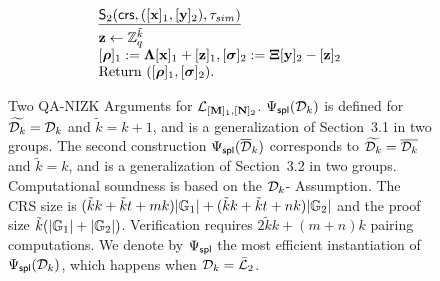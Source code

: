 \begin{figure}
$$\begin{array}{l}
\\
\begin{array}{l}
    \underline{\mathsf{S}_2(\mathsf{crs},([\mathbf{x}]_1,[\mathbf{y}]_2),\tau_{sim})}\\[.1cm]
    \mathbf{z} \gets \mathbb{Z}_q^{\tilde{k}} \\ 
    {[{\boldsymbol \rho}]_1:=\mathbf{{\Lambda}} [\mathbf{x}]_1+ [\mathbf{z}]_1},{[{\boldsymbol \sigma}]_2:=\mathbf{{\Xi}} [\mathbf{y}]_2- [\mathbf{z}]_2}\\
    {\text{Return }  ([{\boldsymbol \rho}]_1,[{\boldsymbol \sigma}]_2).}
\end{array}
\\
\end{array}
$$
\caption{Two QA-NIZK Arguments for  $\mathcal{L}_{[\mathbf{{M}}]_1,[\mathbf{{N}}]_2}$. ${\Psi_{\mathsf{spl}}(\mathcal{D}_k)}$ is 
 defined for $\widetilde{\mathcal{D}_{k}}=\mathcal{D}_k$ and $\tilde{k}=k+1$, and is a generalization of  
 \cite{EC:KilWee15} Section~3.1 in two groups. The second construction ${\Psi_\mathsf{spl}(\overline{\mathcal{D}}_k)}$ corresponds to $\widetilde{\mathcal{D}_{k}}=\overline{\mathcal{D}_k}$ and $\tilde{k}=k$, and is a generalization of   \cite{EC:KilWee15} Section~3.2 in two groups. Computational soundness is based on the $\mathcal{D}_{k}$-\skermdh{} Assumption. The CRS size is $(\tilde{k}k+\tilde{k}t+mk)|\mathbb{G}_1|+(\tilde{k}k+\tilde{k}t+nk)|\mathbb{G}_2|$ and the proof size $\tilde{k}(|\mathbb{G}_1|+|\mathbb{G}_2|)$. Verification requires $2\tilde{k}k+(m+n)k$ pairing computations. We denote by $\Psi_{\mathsf{spl}}$ the most efficient instantiation of ${\Psi_{\mathsf{spl}}(\mathcal{D}_k)}$, which happens when $\mathcal{D}_k=\bar{\mathcal{L}}_2$. \label{fig:QANIZKtwogroups} }
\end{figure}

